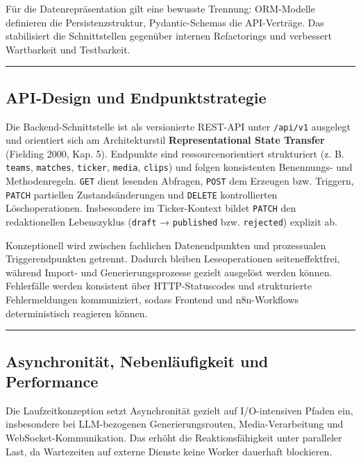 Für die Datenrepräsentation gilt eine bewusste Trennung: ORM-Modelle
definieren die Persistenzstruktur, Pydantic-Schemas die API-Verträge.
Das stabilisiert die Schnittstellen gegenüber internen Refactorings und
verbessert Wartbarkeit und Testbarkeit.

\begin{center}\rule{0.5\linewidth}{0.5pt}\end{center}

\subsection{API-Design und
Endpunktstrategie}\label{api-design-und-endpunktstrategie}

Die Backend-Schnittstelle ist als versionierte REST-API unter
\texttt{/api/v1} ausgelegt und orientiert sich am Architekturstil
\textbf{Representational State Transfer} (Fielding 2000, Kap. 5).
Endpunkte sind ressourcenorientiert strukturiert (z. B. \texttt{teams},
\texttt{matches}, \texttt{ticker}, \texttt{media}, \texttt{clips}) und
folgen konsistenten Benennungs- und Methodenregeln. \texttt{GET} dient
lesenden Abfragen, \texttt{POST} dem Erzeugen bzw. Triggern,
\texttt{PATCH} partiellen Zustandsänderungen und \texttt{DELETE}
kontrollierten Löschoperationen. Insbesondere im Ticker-Kontext bildet
\texttt{PATCH} den redaktionellen Lebenszyklus (\texttt{draft} →
\texttt{published} bzw. \texttt{rejected}) explizit ab.

Konzeptionell wird zwischen fachlichen Datenendpunkten und prozessualen
Triggerendpunkten getrennt. Dadurch bleiben Leseoperationen
seiteneffektfrei, während Import- und Generierungsprozesse gezielt
ausgelöst werden können. Fehlerfälle werden konsistent über
HTTP-Statuscodes und strukturierte Fehlermeldungen kommuniziert, sodass
Frontend und n8n-Workflows deterministisch reagieren können.

\begin{center}\rule{0.5\linewidth}{0.5pt}\end{center}

\subsection{Asynchronität, Nebenläufigkeit und
Performance}\label{asynchronituxe4t-nebenluxe4ufigkeit-und-performance}

Die Laufzeitkonzeption setzt Asynchronität gezielt auf I/O-intensiven
Pfaden ein, insbesondere bei LLM-bezogenen Generierungsrouten,
Media-Verarbeitung und WebSocket-Kommunikation. Das erhöht die
Reaktionsfähigkeit unter paralleler Last, da Wartezeiten auf externe
Dienste keine Worker dauerhaft blockieren.


